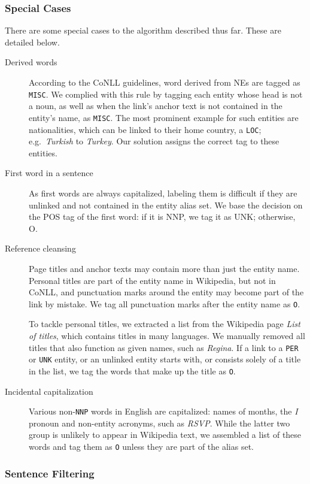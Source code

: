 \documentclass[11pt]{article}
\begin{document}
\subsubsection{Special Cases}

There are some special cases to the algorithm described thus far. These are detailed below.

\begin{description}
\item[Derived words] According to the CoNLL guidelines, word derived from NEs are tagged as \texttt{MISC}. We complied with this rule by tagging each entity whose head is not a noun, as well as when the link's anchor text is not contained in the entity's name, as \texttt{MISC}. The most prominent example for such entities are nationalities, which can be linked to their home country, a \texttt{LOC}; e.g.~\textit{Turkish} to \textit{Turkey}. Our solution assigns the correct tag to these entities.
\item[First word in a sentence] As first words are always capitalized, labeling them is difficult if they are unlinked and not contained in the entity alias set. We base the decision on the POS tag of the first word: if it is NNP, we tag it as UNK; otherwise, O.
\item[Reference cleansing] Page titles and anchor texts may contain more than just the entity name. Personal titles are part of the entity name in Wikipedia, but not in CoNLL, and punctuation marks around the entity may become part of the link by mistake. We tag all punctuation marks after the entity name as \texttt{O}.

To tackle personal titles, we extracted a list from the Wikipedia page \textit{List of titles}, which contains titles in many languages. We manually removed all titles that also function as given names, such as \textit{Regina}. If a link to a \texttt{PER} or \texttt{UNK} entity, or an unlinked entity starts with, or consists solely of a title in the list, we tag the words that make up the title as \texttt{O}.
\item[Incidental capitalization] Various non-\texttt{NNP} words in English are capitalized: names of months, the \textit{I} pronoun and non-entity acronyms, such as \textit{RSVP}. While the latter two group is unlikely to appear in Wikipedia text, we assembled a list of these words and tag them as \texttt{O} unless they are part of the alias set.
\end{description}

\subsubsection{Sentence Filtering}
\end{document}
